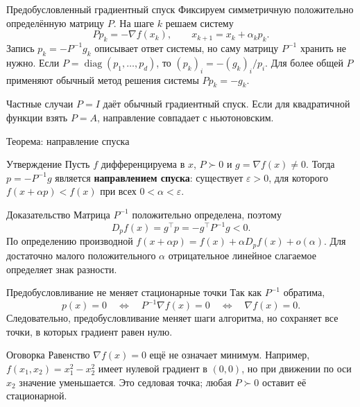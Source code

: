\documentclass[aspectratio=169,10pt]{beamer}
\newcommand{\grad}{\nabla}
\begin{document}
\begin{frame}{Предобусловленный градиентный спуск}
\small
Фиксируем симметричную положительно определённую матрицу $P$. На шаге $k$ решаем систему
\[
Pp_k=-\grad f(x_k),\qquad x_{k+1}=x_k+\alpha_kp_k.
\]
Запись $p_k=-P^{-1}g_k$ описывает ответ системы, но саму матрицу $P^{-1}$ хранить не нужно.
Если $P=\operatorname{diag}(p_1,\ldots,p_d)$, то $(p_k)_i=-(g_k)_i/p_i$.
Для более общей $P$ применяют обычный метод решения системы $Pp_k=-g_k$.
\begin{block}{Частные случаи}
$P=I$ даёт обычный градиентный спуск. Если для квадратичной функции взять $P=A$, направление совпадает с ньютоновским.
\end{block}
\end{frame}

\begin{frame}{Теорема: направление спуска}
\small
\begin{block}{Утверждение}
Пусть $f$ дифференцируема в $x$, $P\succ0$ и $g=\grad f(x)\ne0$.
Тогда $p=-P^{-1}g$ является \textbf{направлением спуска}: существует $\varepsilon>0$, для которого $f(x+\alpha p)<f(x)$ при всех $0<\alpha<\varepsilon$.
\end{block}
\begin{block}{Доказательство}
Матрица $P^{-1}$ положительно определена, поэтому
\[
D_pf(x)=g^\top p=-g^\top P^{-1}g<0.
\]
По определению производной
$f(x+\alpha p)=f(x)+\alpha D_pf(x)+o(\alpha)$.
Для достаточно малого положительного $\alpha$ отрицательное линейное слагаемое определяет знак разности.
\end{block}
\end{frame}

\begin{frame}{Предобусловливание не меняет стационарные точки}
\small
Так как $P^{-1}$ обратима,
\[
p(x)=0
\quad\Longleftrightarrow\quad
P^{-1}\grad f(x)=0
\quad\Longleftrightarrow\quad
\grad f(x)=0.
\]
Следовательно, предобусловливание меняет шаги алгоритма, но сохраняет все точки, в которых градиент равен нулю.
\begin{alertblock}{Оговорка}
Равенство $\nabla f(x)=0$ ещё не означает минимум. Например,
$f(x_1,x_2)=x_1^2-x_2^2$ имеет нулевой градиент в $(0,0)$, но при движении по оси $x_2$ значение уменьшается. Это седловая точка; любая $P\succ0$ оставит её стационарной.
\end{alertblock}
\end{frame}
\end{document}
